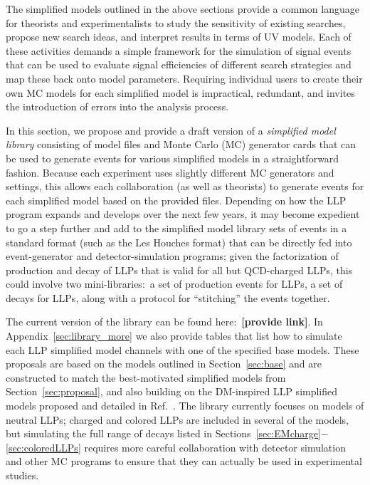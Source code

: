 The simplified models outlined in the above sections provide a common language for theorists and experimentalists to study the sensitivity of existing searches, propose new search ideas, and interpret results in terms of UV models. Each of these activities demands a simple framework for the simulation of signal events that can be used to evaluate signal efficiencies of different search strategies and map these back onto model parameters. Requiring individual users to create their own MC models for each simplified model is impractical, redundant, and invites the introduction of errors into the analysis process.

In this section, we propose and provide a draft version of a \emph{simplified model library} consisting of model files and Monte Carlo (MC) generator cards that can be used to generate events for various simplified models in a straightforward fashion. Because each experiment uses slightly different MC generators and settings, this allows each collaboration (as well as theorists) to generate events for each simplified model based on the provided files. Depending on how the LLP program expands and develops over the next few years, it may become expedient to go a step further and add to the simplified model library sets of events in a standard format (such as the Les Houches format) that can be directly fed into event-generator and detector-simulation programs; given the factorization of production and decay of LLPs that is valid for all but QCD-charged LLPs, this could involve two mini-libraries:~a set of production events for LLPs, a set of decays for LLPs, along with a protocol for ``stitching'' the events together.

The current version of the library can be found here:~{\bf [provide link]}. In Appendix~\ref{sec:library_more} we also provide tables that list how to simulate each LLP simplified model channels with one of the specified base models. These proposals are based on the models outlined in Section~\ref{sec:base} and are constructed to match the best-motivated simplified models from Section~\ref{sec:proposal}, and also building on the DM-inspired LLP simplified models proposed and detailed in Ref.~\cite{Buchmueller:2017uqu}.  The library currently focuses on models of neutral LLPs; charged and colored LLPs are included in several of the models, but  simulating the full range of decays listed in Sections~\ref{sec:EMcharge}$-$\ref{sec:coloredLLPs} requires more careful collaboration with detector simulation and other MC programs to ensure that they can actually be used in experimental studies.


